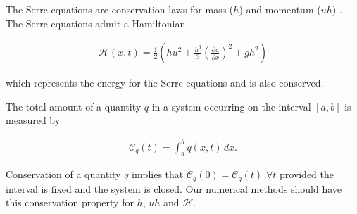 \documentclass[times]{elsarticle}
\begin{document}
The Serre equations are conservation laws for mass ($h$) and momentum ($uh$) \cite{Su-Gardener-1969-536}. The Serre equations admit a Hamiltonian \cite{Li-Y-2002,Green-Naghdi-1976-237}
\begin{linenomath*}
	\begin{gather}
	\label{eqn:Hamildef}
	\mathcal{H}(x,t) = \frac{1}{2} \left(hu^2 + \frac{h^3}{3} \left(\frac{\partial u}{\partial x}\right)^2 + gh^2\right)
	\end{gather}
\end{linenomath*}
which represents the energy for the Serre equations and is also conserved.

The total amount of a quantity $q$ in a system occurring on the interval $[a,b]$ is measured by
\begin{linenomath*}
\begin{gather*}
\label{eqn:Condef}
\mathcal{C}_q(t) = \int_{a}^{b} q(x,t)\, dx .
\end{gather*}
\end{linenomath*}
Conservation of a quantity $q$ implies that $\mathcal{C}_{q}(0) = \mathcal{C}_{q}(t)$ $\forall t$ provided the interval is fixed and the system is closed. Our numerical methods should have this conservation property for $h$, $uh$ and $\mathcal{H}$.  


\end{document}
